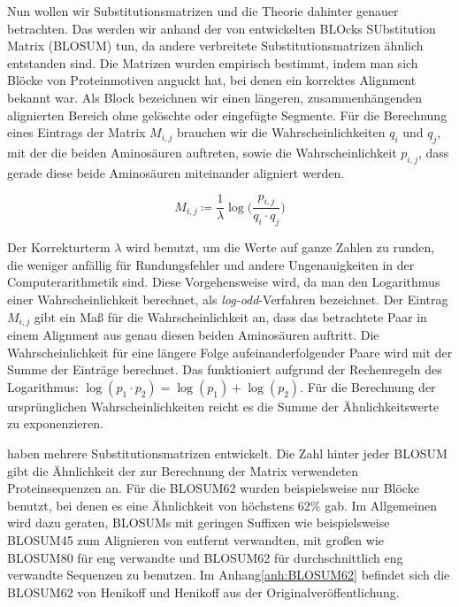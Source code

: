 Nun wollen wir Substitutionsmatrizen und die Theorie dahinter genauer betrachten. Das werden wir anhand der von \cite{hh92} entwickelten BLOcks SUbstitution Matrix (BLOSUM) tun, da andere verbreitete Substitutionsmatrizen ähnlich entstanden sind. Die Matrizen wurden empirisch bestimmt, indem man sich Blöcke von Proteinmotiven anguckt hat, bei denen ein korrektes Alignment bekannt war. Als Block bezeichnen wir einen längeren, zusammenhängenden alignierten Bereich ohne gelöschte oder eingefügte Segmente. Für die Berechnung eines Eintrags der Matrix $M_{i,j}$ brauchen wir die Wahrscheinlichkeiten  $q_i$ und $q_j$, mit der die beiden Aminosäuren auftreten, sowie die Wahrscheinlichkeit $p_{i,j}$, dass gerade diese beide Aminosäuren miteinander aligniert werden.

\begin{equation}
	M_{i,j} \coloneqq \frac{1}{\lambda} \log\bigg( \frac{p_{i,j}}{q_i\cdot q_j} \bigg)
\end{equation}

Der Korrekturterm $\lambda$ wird benutzt, um die Werte auf ganze Zahlen zu runden, die weniger anfällig für Rundungsfehler und andere Ungenauigkeiten in der Computerarithmetik sind. Diese Vorgehensweise wird, da man den Logarithmus einer Wahrscheinlichkeit berechnet, als \emph{log-odd}-Verfahren bezeichnet. Der Eintrag $M_{i,j}$ gibt ein Maß für die Wahrscheinlichkeit an, dass das betrachtete Paar in einem Alignment aus genau diesen beiden Aminosäuren auftritt. Die Wahrscheinlichkeit für eine längere Folge aufeinanderfolgender Paare wird mit der Summe der Einträge berechnet. Das funktioniert aufgrund der Rechenregeln des Logarithmus: $\log(p_1 \cdot p_2) = \log(p_1) + \log(p_2)$. Für die Berechnung der ursprünglichen Wahrscheinlichkeiten reicht es die Summe der Ähnlichkeitswerte zu exponenzieren. 

\cite{hh92} haben mehrere Substitutionsmatrizen entwickelt. Die Zahl hinter jeder BLOSUM gibt die Ähnlichkeit der zur Berechnung der Matrix verwendeten Proteinsequenzen an. Für die BLOSUM62 wurden beispielsweise nur Blöcke benutzt, bei denen es eine Ähnlichkeit von höchstens 62\% gab. Im Allgemeinen wird dazu geraten, BLOSUMs mit geringen Suffixen wie beispielsweise BLOSUM45 zum Alignieren von entfernt verwandten, mit großen wie BLOSUM80 für eng verwandte und BLOSUM62 für durchschnittlich eng verwandte Sequenzen zu benutzen. Im Anhang\ref{anh:BLOSUM62} befindet sich die BLOSUM62 von Henikoff und Henikoff aus der Originalveröffentlichung.

